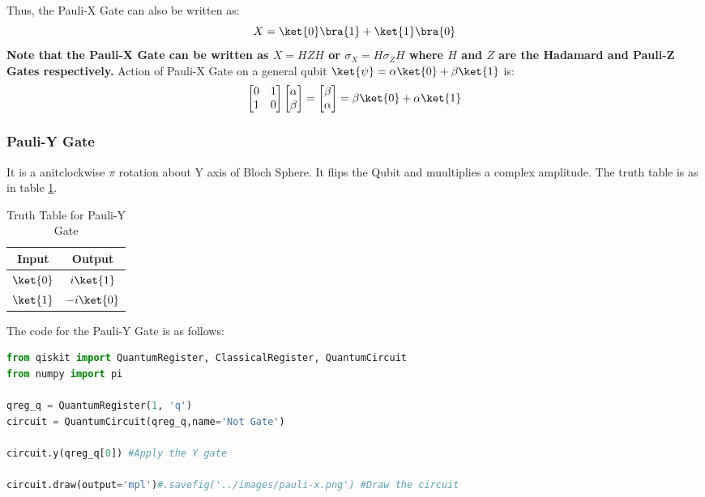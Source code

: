 \documentclass[12pt, oneside]{book}
\theoremstyle{definition}
\theoremstyle{definition}
\theoremstyle{remark}
\begin{document}
Thus, the Pauli-X Gate can also be written as:
\[
    X=\ket{0}\bra{1}+\ket{1}\bra{0}
\]
\textbf{Note that the Pauli-X Gate can be written as $X=HZH$ or $\sigma_X=H\sigma_Z H$  where $H$ and $Z$ are the Hadamard and Pauli-Z Gates respectively.}
Action of Pauli-X Gate on a general qubit $\ket{\psi}=\alpha\ket{0}+\beta\ket{1}$ is: 
\[
    \begin{bmatrix}
        0 & 1 \\
        1 & 0
    \end{bmatrix}\begin{bmatrix}
        \alpha \\
        \beta
    \end{bmatrix}=\begin{bmatrix}
        \beta \\
        \alpha
    \end{bmatrix}= \beta\ket{0}+\alpha\ket{1}
\]

\subsubsection{Pauli-Y Gate}
It is a anitclockwise $\pi$ rotation about Y axis of Bloch Sphere. 
It flips the Qubit and muultiplies a complex amplitude. The truth table is as in table \ref{tab:pauli-y}.
\begin{table}[H]
    \centering
    \begin{tabular}{|c|c|}
        \hline
        Input & Output\\
        \hline
        $\ket{0}$ & $i\ket{1}$\\
        $\ket{1}$ & $-i\ket{0}$\\
        \hline
    \end{tabular}
    \caption{Truth Table for Pauli-Y Gate}
    \label{tab:pauli-y}
\end{table}
The code for the Pauli-Y Gate is as follows:
\begin{lstlisting}[language=Python]
from qiskit import QuantumRegister, ClassicalRegister, QuantumCircuit
from numpy import pi

qreg_q = QuantumRegister(1, 'q')
circuit = QuantumCircuit(qreg_q,name='Not Gate')

circuit.y(qreg_q[0]) #Apply the Y gate

circuit.draw(output='mpl')#.savefig('../images/pauli-x.png') #Draw the circuit
\end{lstlisting}
\end{document}
